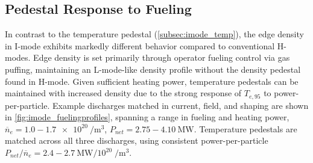 \begin{figure}
 \pushtooutside
\end{figure}

\subsection{Pedestal Response to Fueling}\label{subsec:imode_fueling}

In contrast to the temperature pedestal (\cref{subsec:imode_temp}), the edge density in I-mode exhibits markedly different behavior compared to conventional H-modes.  Edge density is set primarily through operator fueling control via gas puffing, maintaining an L-mode-like density profile without the density pedestal found in H-mode.  Given sufficient heating power, temperature pedestals can be maintained with increased density due to the strong response of $T_{e,95}$ to power-per-particle.  Example discharges matched in current, field, and shaping are shown in \cref{fig:imode_fuelingprofiles}, spanning a range in fueling and heating power, $\overline{n}_e = 1.0 - \SI{1.7e20}{\per\meter\cubed}$, $P_{net} = 2.75 - \SI{4.10}{\mega\watt}$.  Temperature pedestals are matched across all three discharges, using consistent power-per-particle $P_{net}/\overline{n}_e = 2.4 - \SI{2.7}{\mega\watt}/10^{20}\;\si{\per\meter\cubed}$.

